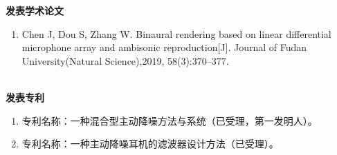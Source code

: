 
\Work

\noindent
\textbf{发表学术论文}
\begin{enumerate}
	\renewcommand{\labelenumi}{[\theenumi]}
	\item Chen J, Dou S, Zhang W. Binaural rendering based on linear differential microphone array and ambisonic reproduction[J]. Journal of Fudan University(Natural Science),2019, 58(3):370–377.
\end{enumerate}

~\\

\noindent
\textbf{发表专利}
\begin{enumerate}
	\renewcommand{\labelenumi}{[\theenumi]}
	\item 专利名称：一种混合型主动降噪方法与系统（已受理，第一发明人）。
	\item 专利名称：一种主动降噪耳机的滤波器设计方法（已受理）。
\end{enumerate}